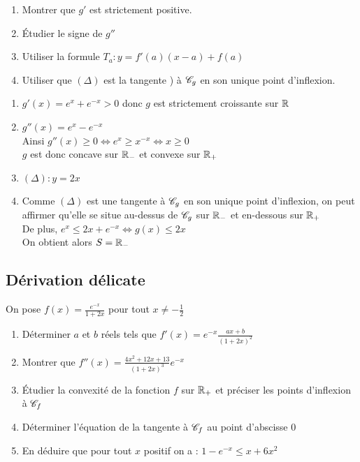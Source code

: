 \documentclass[oneside,12pt]{book}          %
\begin{document}
\begin{hint}
	\begin{enumerate}
		\item Montrer que $g'$ est strictement positive.
		\item Étudier le signe de $g''$
		\item Utiliser la formule $T_a:y=f'(a)(x-a)+f(a)$
		\item Utiliser que $(\Delta)$ est la tangente ) à ${\mathscr{C}}_g$ en son unique point d'inflexion.
	\end{enumerate}
\end{hint}
\begin{sol}
	\begin{enumerate}
		\item $g'(x)=e^x+e^{-x}>0$ donc $g$ est strictement croissante sur ${\mathbb R}$
		\item $g''(x)=e^x-e^{-x}$\\
		Ainsi $g''(x)\geq0 \Leftrightarrow e^x\geq x^{-x} \Leftrightarrow x\geq0$\\
		$g$ est donc concave sur ${\mathbb R}_-$ et convexe sur ${\mathbb R}_+$
		\item $(\Delta):y=2x$
		\item Comme $(\Delta)$ est une tangente à ${\mathscr{C}}_g$ en son unique point d'inflexion, on peut affirmer qu'elle se situe au-dessus de ${\mathscr{C}}_g$ sur ${\mathbb R}_-$ et en-dessous sur ${\mathbb R}_+$\\
		De plus, $e^x\leq2x+e^{-x} \Leftrightarrow g(x)\leq2x$\\
		On obtient alors $S={\mathbb R}_-$
	\end{enumerate}
\end{sol}



\subsection{Dérivation délicate}
On pose $f(x)=\frac{e^{-x}}{1+2x}$ pour tout $x\neq-\frac{1}{2}$
\begin{enumerate}
    \item Déterminer $a$ et $b$ réels tels que $f'(x)=e^{-x}\frac{ax+b}{(1+2x)^2}$
    \item Montrer que $f''(x)=\frac{4x^2+12x+13}{(1+2x)^3}e^{-x}$
    \item Étudier la convexité de la fonction $f$ sur ${\mathbb R}_+$ et préciser les points d'inflexion à ${\mathscr{C}}_f$
    \item Déterminer l'équation de la tangente à ${\mathscr{C}}_f$ au point d'abscisse 0
    \item En déduire que pour tout $x$ positif on a : $1-e^{-x}\leq x+6x^2$
\end{enumerate}
\end{document}
